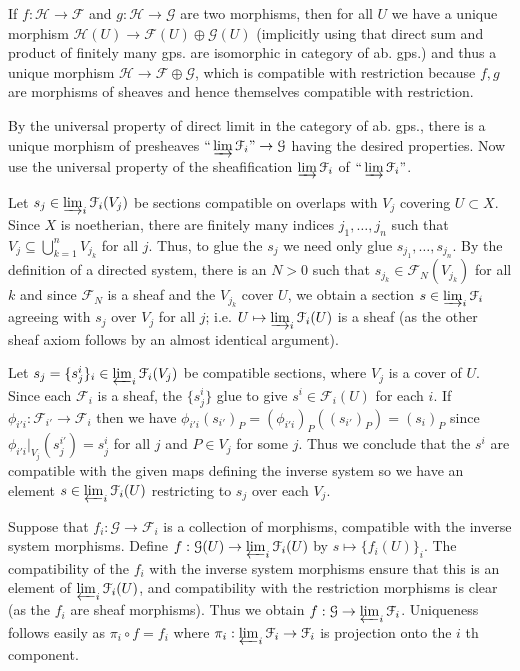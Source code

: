 \documentclass{report}
\newcommand{\F}{\mathcal{F}}
\newcommand{\G}{\mathcal{G}}
\renewcommand{\H}{\mathcal{H}}
\begin{document}
If $f:\H\rightarrow \F$ and $g:\H\rightarrow \G$ are two morphisms, then for all $U$ we have 
a unique morphism $\H(U)\rightarrow \F(U)\oplus \G(U)$ (implicitly using that direct sum and product
of finitely many gps. are isomorphic in category of ab. gps.)  and thus a unique morphism
$\H\rightarrow \F\oplus\G$, which is compatible with restriction because $f,g$ are morphisms of sheaves
and hence themselves compatible with restriction.

\bigskip
{}	By the universal property of direct limit in the category of ab. gps., there is a unique morphism of
presheaves $``\varinjlim \F_i"\rightarrow \G$ having the desired properties.  Now use the universal 
property of the sheafification $\varinjlim \F_i$ of $``\varinjlim \F_i"$.

\bigskip
{}	Let $s_j\in \varinjlim_{i} \F_i(V_j)$ be sections compatible on overlaps with $V_j$ covering $U\subset X$.
Since $X$ is noetherian,
there are finitely many indices $j_1,\ldots,j_n$ such that $V_j\subseteq \bigcup_{k=1}^n V_{j_k}$
for all $j$.  Thus, to glue the $s_j$ we need only glue $s_{j_1},\ldots,s_{j_n}$.  By the definition
of a directed system, there is an $N>0$ such that $s_{j_k}\in \F_N(V_{j_k})$ for all $k$ and since
$\F_N$ is a sheaf and the $V_{j_k}$ cover $U$, we obtain a section $s\in \varinjlim_i \F_i$
agreeing with $s_j$ over $V_j$ for all $j$; i.e. $U\mapsto \varinjlim_i \F_i(U)$ is a sheaf (as the other sheaf
axiom follows by an almost identical argument).

\bigskip
{}	  Let $s_j=\{s^i_j\}_i\in\varprojlim_i \F_i(V_j)$ be compatible sections, where $V_j$ is a cover of $U$.
Since each $\F_i$ is a sheaf, the $\{s_j^i\}$ glue to give $s^i\in \F_i(U)$ for each $i$.  If $\phi_{i'i}:\F_{i'}\rightarrow \F_i$
then we have $\phi_{i'i}(s_{i'})_P=(\phi_{i'i})_P((s_{i'})_P)=(s_i)_P$ since $\phi_{i'i}\big|_{V_j}(s_j^{i'})=s_j^{i}$ for all $j$
and $P\in V_j$ for some $j$.	Thus we conclude that the $s^i$ are compatible with the given maps defining the inverse system
so we have an element $s\in \varprojlim_i \F_i(U)$ restricting to $s_j$ over each $V_j$.

Suppose that $f_i:\G\rightarrow \F_i$ is a collection of morphisms, compatible with the inverse system morphisms.
Define $f:\G(U)\rightarrow \varprojlim_i \F_i(U)$ by $s\mapsto \{f_i(U)\}_i$.  The compatibility of the $f_i$ with the
inverse system morphisms ensure that this is an element of $\varprojlim_i\F_i(U)$, and compatibility with the restriction
morphisms is clear (as the $f_i$ are sheaf morphisms).  Thus we obtain $f:\G\rightarrow \varprojlim_i\F_i$.  Uniqueness
follows easily as $\pi_i\circ f=f_i$ where $\pi_i:\varprojlim_i \F_i\rightarrow \F_i$ is projection onto the $i$ th component.
\end{document}
